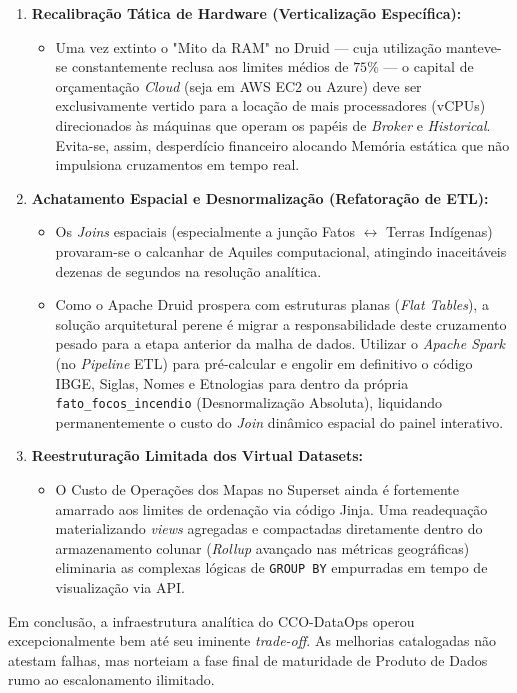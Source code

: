\begin{enumerate}
    \item \textbf{Recalibração Tática de Hardware (Verticalização Específica):}
    \begin{itemize}
        \item Uma vez extinto o "Mito da RAM" no Druid --- cuja utilização manteve-se constantemente reclusa aos limites médios de $75\%$ --- o capital de orçamentação \textit{Cloud} (seja em AWS EC2 ou Azure) deve ser exclusivamente vertido para a locação de mais processadores (vCPUs) direcionados às máquinas que operam os papéis de \textit{Broker} e \textit{Historical}. Evita-se, assim, desperdício financeiro alocando Memória estática que não impulsiona cruzamentos em tempo real.
    \end{itemize}

    \item \textbf{Achatamento Espacial e Desnormalização (Refatoração de ETL):}
    \begin{itemize}
        \item Os \textit{Joins} espaciais (especialmente a junção Fatos $\leftrightarrow$ Terras Indígenas) provaram-se o calcanhar de Aquiles computacional, atingindo inaceitáveis dezenas de segundos na resolução analítica.
        \item Como o Apache Druid prospera com estruturas planas (\textit{Flat Tables}), a solução arquitetural perene é migrar a responsabilidade deste cruzamento pesado para a etapa anterior da malha de dados. Utilizar o \textit{Apache Spark} (no \textit{Pipeline} ETL) para pré-calcular e engolir em definitivo o código IBGE, Siglas, Nomes e Etnologias para dentro da própria \texttt{fato\_focos\_incendio} (Desnormalização Absoluta), liquidando permanentemente o custo do \textit{Join} dinâmico espacial do painel interativo.
    \end{itemize}

    \item \textbf{Reestruturação Limitada dos Virtual Datasets:}
    \begin{itemize}
        \item O Custo de Operações dos Mapas no Superset ainda é fortemente amarrado aos limites de ordenação via código Jinja. Uma readequação materializando \textit{views} agregadas e compactadas diretamente dentro do armazenamento colunar (\textit{Rollup} avançado nas métricas geográficas) eliminaria as complexas lógicas de \texttt{GROUP BY} empurradas em tempo de visualização via API.
    \end{itemize}
\end{enumerate}

Em conclusão, a infraestrutura analítica do CCO-DataOps operou excepcionalmente bem até seu iminente \textit{trade-off}. As melhorias catalogadas não atestam falhas, mas norteiam a fase final de maturidade de Produto de Dados rumo ao escalonamento ilimitado.
